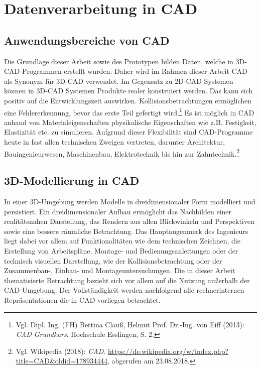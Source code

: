 \chapter{Datenverarbeitung in CAD}
\section{Anwendungsbereiche von CAD}
\label{sec:DatenverarbeitungInCAD}

Die Grundlage dieser Arbeit sowie des Prototypen bilden Daten, welche in 3D-CAD-Programmen erstellt wurden. Daher wird im Rahmen dieser Arbeit CAD als Synonym für 3D-CAD verwendet. Im Gegensatz zu 2D-CAD Systemen können in 3D-CAD Systemen Produkte realer konstruiert werden. Das kann sich positiv auf die Entwicklungszeit auswirken. Kollisionsbetrachtungen ermöglichen eine Fehlererkennung, bevor das erste Teil gefertigt wird.\footnote{Vgl. Dipl. Ing. (FH) Bettina Clauß, Helmut Prof. Dr.-Ing. von Eiff (2013): \textit{CAD Grundkurs}. Hochschule Esslingen, S. 2.} Es ist möglich in CAD anhand von Materialeigenschaften physikalische Eigenschaften wie z.B. Festigkeit, Elastizität etc. zu simulieren. Aufgrund dieser Flexibilität sind CAD-Programme heute in fast allen technischen Zweigen vertreten, darunter Architektur, Bauingenieurwesen, Maschinenbau, Elektrotechnik bis hin zur Zahntechnik.\footnote{Vgl. Wikipedia  (2018): \textit{CAD}.\newline
\url{https://de.wikipedia.org/w/index.php?title=CAD&oldid=178934444},\newline 
abgerufen am 23.08.2018.}


\section{3D-Modellierung in CAD}
\label{sec:3D-ModellierungInCAD}
In einer 3D-Umgebung werden Modelle in dreidimensionaler Form modelliert und persistiert. Ein dreidimensionaler Aufbau ermöglicht das Nachbilden einer realitätsnahen Darstellung, das Rendern aus allen Blickwinkeln und Perspektiven sowie eine bessere räumliche Betrachtung. Das Hauptaugenmerk des Ingenieurs liegt dabei vor allem auf Funktionalitäten wie dem technischen Zeichnen, die Erstellung von Arbeitspläne, Montage- und Bedienungsanleitungen oder der technisch visuellen Darstellung, wie der Kollisionsbetrachtung oder der
Zusammenbau-, Einbau- und Montageuntersuchungen. 
Die in dieser Arbeit thematisierte Betrachtung bezieht sich vor allem auf die Nutzung außerhalb der CAD-Umgebung.  Der Vollständigkeit werden nachfolgend alle rechnerinternen Repräsentationen die in CAD vorliegen betrachtet.

